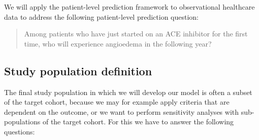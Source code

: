 \documentclass[11pt]{book}
\theoremstyle{definition}
\theoremstyle{definition}
\theoremstyle{definition}
\theoremstyle{remark}
\begin{document}
We will apply the patient-level prediction framework to observational healthcare data to address the following patient-level prediction question:

\begin{quote}
Among patients who have just started on an ACE inhibitor for the first time, who will experience angioedema in the following year?
\end{quote}

\hypertarget{study-population-definition}{%
\subsection{Study population definition}\label{study-population-definition}}

The final study population in which we will develop our model is often a subset of the target cohort, because we may for example apply criteria that are dependent on the outcome, or we want to perform sensitivity analyses with sub-populations of the target cohort. For this we have to answer the following questions:
\end{document}
